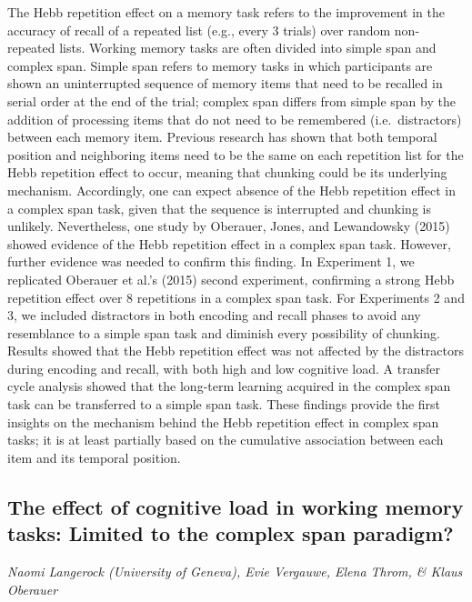\documentclass[12pt,]{book}
\begin{document}
The Hebb repetition effect on a memory task refers to the improvement in the accuracy of recall of a repeated list (e.g., every 3 trials) over random non-repeated lists. Working memory tasks are often divided into simple span and complex span. Simple span refers to memory tasks in which participants are shown an uninterrupted sequence of memory items that need to be recalled in serial order at the end of the trial; complex span differs from simple span by the addition of processing items that do not need to be remembered (i.e.~distractors) between each memory item. Previous research has shown that both temporal position and neighboring items need to be the same on each repetition list for the Hebb repetition effect to occur, meaning that chunking could be its underlying mechanism. Accordingly, one can expect absence of the Hebb repetition effect in a complex span task, given that the sequence is interrupted and chunking is unlikely. Nevertheless, one study by Oberauer, Jones, and Lewandowsky (2015) showed evidence of the Hebb repetition effect in a complex span task. However, further evidence was needed to confirm this finding.
In Experiment 1, we replicated Oberauer et al.'s (2015) second experiment, confirming a strong Hebb repetition effect over 8 repetitions in a complex span task. For Experiments 2 and 3, we included distractors in both encoding and recall phases to avoid any resemblance to a simple span task and diminish every possibility of chunking. Results showed that the Hebb repetition effect was not affected by the distractors during encoding and recall, with both high and low cognitive load. A transfer cycle analysis showed that the long-term learning acquired in the complex span task can be transferred to a simple span task. These findings provide the first insights on the mechanism behind the Hebb repetition effect in complex span tasks; it is at least partially based on the cumulative association between each item and its temporal position.

\hypertarget{the-effect-of-cognitive-load-in-working-memory-tasks-limited-to-the-complex-span-paradigm}{%
\subsection{The effect of cognitive load in working memory tasks: Limited to the complex span paradigm?}\label{the-effect-of-cognitive-load-in-working-memory-tasks-limited-to-the-complex-span-paradigm}}

\emph{Naomi Langerock (University of Geneva), Evie Vergauwe, Elena Throm, \& Klaus Oberauer}
\end{document}
